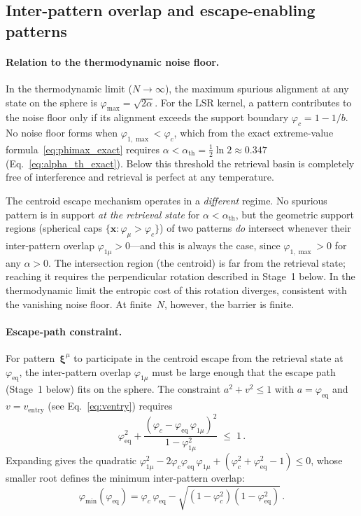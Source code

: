 \documentclass[11pt]{article}
\newcommand{\bxi}{\boldsymbol{\xi}}
\newcommand{\bx}{\mathbf{x}}
\begin{document}
\subsection{Inter-pattern overlap and escape-enabling patterns}

\paragraph{Relation to the thermodynamic noise floor.}
In the thermodynamic limit ($N\to\infty$), the maximum spurious alignment at any state on the sphere is $\varphi_{\max} = \sqrt{2\alpha}$.  For the LSR kernel, a pattern contributes to the noise floor only if its alignment exceeds the support boundary $\varphi_c = 1 - 1/b$.  No noise floor forms when $\varphi_{1,\max} < \varphi_c$, which from the exact extreme-value formula~\eqref{eq:phimax_exact} requires $\alpha < \alpha_{\mathrm{th}} = \tfrac{1}{2}\ln 2 \approx 0.347$ (Eq.~\eqref{eq:alpha_th_exact}).  Below this threshold the retrieval basin is completely free of interference and retrieval is perfect at any temperature.

The centroid escape mechanism operates in a \emph{different} regime.  No spurious pattern is in support \emph{at the retrieval state} for $\alpha < \alpha_{\mathrm{th}}$, but the geometric support regions (spherical caps $\{\bx : \varphi_\mu > \varphi_c\}$) of two patterns \emph{do} intersect whenever their inter-pattern overlap $\varphi_{1\mu} > 0$---and this is always the case, since $\varphi_{1,\max} > 0$ for any $\alpha > 0$.  The intersection region (the centroid) is far from the retrieval state; reaching it requires the perpendicular rotation described in Stage~1 below.  In the thermodynamic limit the entropic cost of this rotation diverges, consistent with the vanishing noise floor.  At finite~$N$, however, the barrier is finite.

\paragraph{Escape-path constraint.}
For pattern~$\bxi^\mu$ to participate in the centroid escape from the retrieval state at $\varphi_{\mathrm{eq}}$, the inter-pattern overlap $\varphi_{1\mu}$ must be large enough that the escape path (Stage~1 below) fits on the sphere.  The constraint $a^2 + v^2 \leq 1$ with $a = \varphi_{\mathrm{eq}}$ and $v = v_{\mathrm{entry}}$ (see Eq.~\eqref{eq:ventry}) requires
\begin{equation}
\varphi_{\mathrm{eq}}^2 + \frac{(\varphi_c - \varphi_{\mathrm{eq}}\,\varphi_{1\mu})^2}{1-\varphi_{1\mu}^2} \;\leq\; 1\,.
\label{eq:sphere_constraint}
\end{equation}
Expanding gives the quadratic $\varphi_{1\mu}^2 - 2\varphi_c\varphi_{\mathrm{eq}}\,\varphi_{1\mu} + (\varphi_c^2 + \varphi_{\mathrm{eq}}^2 - 1) \leq 0$, whose smaller root defines the minimum inter-pattern overlap:
\begin{equation}
\varphi_{\min}(\varphi_{\mathrm{eq}}) = \varphi_c\,\varphi_{\mathrm{eq}} - \sqrt{(1-\varphi_c^2)(1-\varphi_{\mathrm{eq}}^2)}\,.
\label{eq:qmin}
\end{equation}
\end{document}
